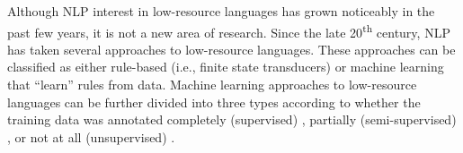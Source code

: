 Although NLP interest in low-resource languages has grown noticeably in the past few years, it is not a new area of research. Since the late 20\textsuperscript{th} century, NLP has taken several approaches to low-resource languages. These approaches can be classified as either rule-based (i.e., finite state transducers) \citep{cotterell_labeled_2015,forsberg_learning_2016,moeller_neural_2018,moeller_improving_2019} or machine learning that ``learn'' rules from data. Machine learning approaches to low-resource languages can be further divided into three types according to whether the training data was annotated completely (supervised) \citep{bergmanis_training_2017,sudhakar_experiments_2017,makarov_align_2017,liu_morphological_2018,makarov_uzh_2018}, partially (semi-supervised) \citep{ahlberg_semi-supervised_2014}, or not at all (unsupervised) \citep{moon_unsupervised_2009,palmer_computational_2010,kirschenbaum_unsupervised_2012,soricut_unsupervised_2015}. 

